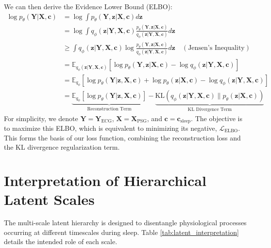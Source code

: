 \documentclass[11pt,en]{elegantpaper}
\newcommand{\KL}[2]{\text{KL}\left(#1 \parallel #2\right)}
\begin{document}
We can then derive the Evidence Lower Bound (ELBO):
\begin{align}
\log p_\theta(\mathbf{Y} | \mathbf{X}, \mathbf{c}) &= \log \int p_\theta(\mathbf{Y}, \mathbf{z} | \mathbf{X}, \mathbf{c}) d\mathbf{z} \\
&= \log \int q_\phi(\mathbf{z} | \mathbf{Y}, \mathbf{X}, \mathbf{c}) \frac{p_\theta(\mathbf{Y}, \mathbf{z} | \mathbf{X}, \mathbf{c})}{q_\phi(\mathbf{z} | \mathbf{Y}, \mathbf{X}, \mathbf{c})} d\mathbf{z} \\
&\geq \int q_\phi(\mathbf{z} | \mathbf{Y}, \mathbf{X}, \mathbf{c}) \log \frac{p_\theta(\mathbf{Y}, \mathbf{z} | \mathbf{X}, \mathbf{c})}{q_\phi(\mathbf{z} | \mathbf{Y}, \mathbf{X}, \mathbf{c})} d\mathbf{z} \quad (\text{Jensen's Inequality}) \\
&= \mathbb{E}_{q_\phi(\mathbf{z}|\mathbf{Y},\mathbf{X},\mathbf{c})} \left[ \log p_\theta(\mathbf{Y}, \mathbf{z} | \mathbf{X}, \mathbf{c}) - \log q_\phi(\mathbf{z} | \mathbf{Y}, \mathbf{X}, \mathbf{c}) \right] \\
&= \mathbb{E}_{q_\phi} \left[ \log p_\theta(\mathbf{Y} | \mathbf{z}, \mathbf{X}, \mathbf{c}) + \log p_\theta(\mathbf{z} | \mathbf{X}, \mathbf{c}) - \log q_\phi(\mathbf{z} | \mathbf{Y}, \mathbf{X}, \mathbf{c}) \right] \\
&= \underbrace{\mathbb{E}_{q_\phi}[\log p_\theta(\mathbf{Y} | \mathbf{z}, \mathbf{X}, \mathbf{c})]}_{\text{Reconstruction Term}} - \underbrace{\KL{q_\phi(\mathbf{z} | \mathbf{Y}, \mathbf{X}, \mathbf{c})}{p_\theta(\mathbf{z} | \mathbf{X}, \mathbf{c})}}_{\text{KL Divergence Term}}
\end{align}
For simplicity, we denote $\mathbf{Y} = \mathbf{Y}_{\text{ECG}}$, $\mathbf{X} = \mathbf{X}_{\text{PSG}}$, and $\mathbf{c} = \mathbf{c}_{\text{sleep}}$. The objective is to maximize this ELBO, which is equivalent to minimizing its negative, $\mathcal{L}_{\text{ELBO}}$. This forms the basis of our loss function, combining the reconstruction loss and the KL divergence regularization term.

\section{Interpretation of Hierarchical Latent Scales}
\label{app:latent_scales}

The multi-scale latent hierarchy is designed to disentangle physiological processes occurring at different timescales during sleep. Table \ref{tab:latent_interpretation} details the intended role of each scale.
\end{document}
